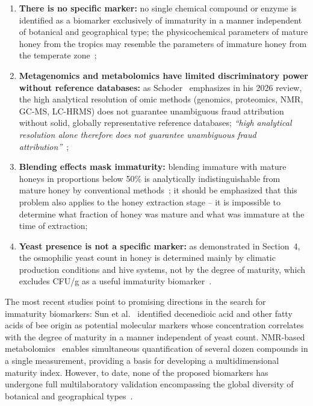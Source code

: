 \begin{enumerate}
    \item \textbf{There is no specific marker:}
          no single chemical compound or enzyme is identified
          as a biomarker exclusively of immaturity in a manner
          independent of botanical and geographical type;
          the physicochemical parameters of mature honey from
          the tropics may resemble the parameters of immature
          honey from the temperate zone~\cite{tsagkaris2021,guo2020};
    \item \textbf{Metagenomics and metabolomics have limited
          discriminatory power without reference databases:}
          as Schoder~\cite{schoder2026} emphasizes in his 2026
          review, the high analytical resolution of omic methods
          (genomics, proteomics, NMR, GC-MS, LC-HRMS) does not
          guarantee unambiguous fraud attribution without solid,
          globally representative reference databases;
          \textit{``high analytical resolution alone therefore
          does not guarantee unambiguous fraud
          attribution''}~\cite{schoder2026};
    \item \textbf{Blending effects mask immaturity:}
          blending immature with mature honeys in proportions
          below 50\% is analytically indistinguishable from mature
          honey by conventional methods~\cite{schoder2026}; it
          should be emphasized that this problem also applies to
          the honey extraction stage -- it is impossible to
          determine what fraction of honey was mature and what
          was immature at the time of extraction;
    \item \textbf{Yeast presence is not a specific marker:}
          as demonstrated in Section~4, the osmophilic yeast count
          in honey is determined mainly by climatic production
          conditions and hive systems, not by the degree of
          maturity, which excludes CFU/g as a useful immaturity
          biomarker~\cite{rodriguezmachado2024,schoder2026}.
\end{enumerate}

The most recent studies point to promising directions in the search
for immaturity biomarkers: Sun et al.~\cite{sun2021} identified
decenedioic acid and other fatty acids of bee origin as potential
molecular markers whose concentration correlates with the degree of
maturity in a manner independent of yeast count. NMR-based
metabolomics~\cite{nmrhoney2023} enables simultaneous quantification
of several dozen compounds in a single measurement, providing
a basis for developing a multidimensional maturity index. However,
to date, none of the proposed biomarkers has undergone full
multilaboratory validation encompassing the global diversity of
botanical and geographical types~\cite{tsagkaris2021}.

